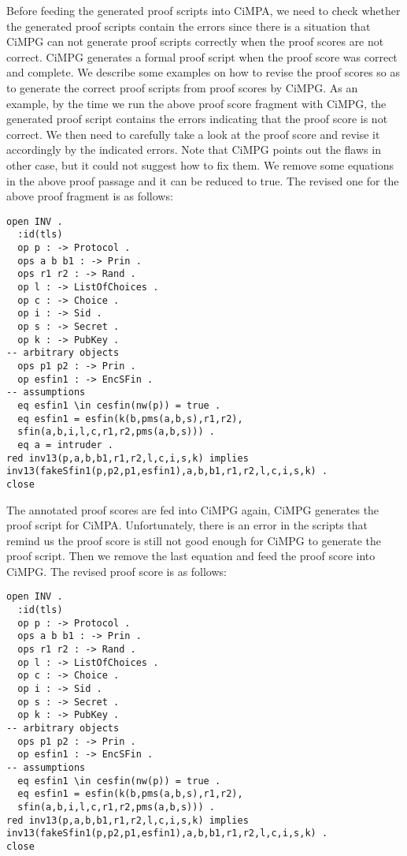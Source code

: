 \documentclass[a4paper,fleqn]{cas-dc}
\begin{document}
Before feeding the generated proof scripts into CiMPA, we need to check whether the generated proof scripts contain the errors since there is a situation that CiMPG can not generate proof scripts correctly when the proof scores are not correct. CiMPG generates a formal proof script when the proof score was correct and complete. We describe some examples on how to revise the proof scores so as to generate the correct proof scripts from proof scores by CiMPG. As an example, by the time we run the above proof score fragment with CiMPG, the generated proof script contains the errors indicating that the proof score is not correct. We then need to carefully take a look at the proof score and revise it accordingly by the indicated errors. Note that CiMPG points out the flaws in other case, but it could not suggest how to fix them. We remove some equations in the above proof passage and it can be reduced to true. The revised one for the above proof fragment is as follows:
\begin{small}
\begin{verbatim}
open INV .
  :id(tls)
  op p : -> Protocol .
  ops a b b1 : -> Prin .
  ops r1 r2 : -> Rand .
  op l : -> ListOfChoices .
  op c : -> Choice .
  op i : -> Sid .
  op s : -> Secret .
  op k : -> PubKey .
-- arbitrary objects
  ops p1 p2 : -> Prin .
  op esfin1 : -> EncSFin .
-- assumptions
  eq esfin1 \in cesfin(nw(p)) = true .
  eq esfin1 = esfin(k(b,pms(a,b,s),r1,r2),
  sfin(a,b,i,l,c,r1,r2,pms(a,b,s))) .
  eq a = intruder .
red inv13(p,a,b,b1,r1,r2,l,c,i,s,k) implies
inv13(fakeSfin1(p,p2,p1,esfin1),a,b,b1,r1,r2,l,c,i,s,k) .
close
\end{verbatim}
\end{small}
The annotated proof scores are fed into CiMPG again, CiMPG  generates the proof script for CiMPA. Unfortunately, there is an error in the scripts that remind us the proof score is still not good enough for CiMPG to generate the proof script. Then we remove the last equation and feed the proof score into CiMPG. The revised proof score is as follows:
\begin{small}
\begin{verbatim}
open INV .
  :id(tls)
  op p : -> Protocol .
  ops a b b1 : -> Prin .
  ops r1 r2 : -> Rand .
  op l : -> ListOfChoices .
  op c : -> Choice .
  op i : -> Sid .
  op s : -> Secret .
  op k : -> PubKey .
-- arbitrary objects
  ops p1 p2 : -> Prin .
  op esfin1 : -> EncSFin .
-- assumptions
  eq esfin1 \in cesfin(nw(p)) = true .
  eq esfin1 = esfin(k(b,pms(a,b,s),r1,r2),
  sfin(a,b,i,l,c,r1,r2,pms(a,b,s))) .
red inv13(p,a,b,b1,r1,r2,l,c,i,s,k) implies
inv13(fakeSfin1(p,p2,p1,esfin1),a,b,b1,r1,r2,l,c,i,s,k) .
close
\end{verbatim}
\end{small}
\end{document}
